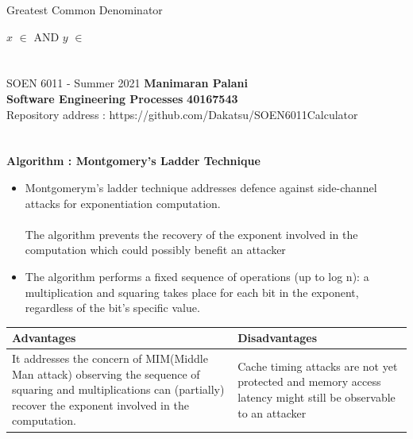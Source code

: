\documentclass[letterpaper, 11pt]{report}
\begin{document}
\begin{algorithm}
\caption{Greatest Common Denominator}
\begin{algorithmic}
\Require $x$ $\in$  AND $y$ $\in$ 
    \EndIf
    \EndIf
        \EndIf
    \EndFor \\
\EndFunction
\end{algorithmic}
\end{algorithm}

\pagebreak



\section*{}
\normalsize {SOEN 6011 - Summer 2021} \hfill \textbf{Manimaran Palani} \\
\textbf{ Software Engineering Processes}  \hfill \textbf{40167543} \\
\hfill Repository address : https://github.com/Dakatsu/SOEN6011Calculator
\\
\textbf{\\ \\ Algorithm : Montgomery's Ladder Technique}\cite{Peter} 
\begin{itemize}
\item Montgomerym's ladder technique addresses defence against side-channel attacks for exponentiation computation. \\\\
The algorithm prevents the recovery of the exponent involved in the computation which could possibly benefit an attacker
\item The algorithm performs a fixed sequence of operations (up to log n): a multiplication and squaring takes place for each bit in the exponent, regardless of the bit's specific value.
\end{itemize}
\vspace*{0.2in}
\setlength{\tabcolsep}{18pt}
\renewcommand{\arraystretch}{1.5}
\begin{tabular}{ |p{6cm}|p{6cm}| }
\hline
\textbf{Advantages} & \textbf{Disadvantages}
\\ \hline 
It addresses the concern of MIM(Middle Man attack) observing the sequence of squaring and multiplications can (partially) recover the exponent involved in the computation. & Cache timing attacks are not yet protected and memory access latency might still be observable to an attacker\\
\hline
\end{tabular} 
\end{document}
